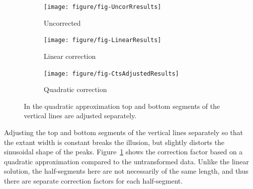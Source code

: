 \documentclass[12pt]{article}\usepackage[]{graphicx}\usepackage[]{color}
\newenvironment{knitrout}{}{} %
\begin{document}
\begin{figure}[h!btp]
\begin{subfigure}[b]{.32\textwidth}\centering
\begin{knitrout}
\color{fgcolor}

{\centering \texttt{[image: figure/fig-UncorRresults]} 

}



\end{knitrout}
\caption{Uncorrected}
\end{subfigure}
\begin{subfigure}[b]{.32\textwidth}\centering
\begin{knitrout}
\color{fgcolor}

{\centering \texttt{[image: figure/fig-LinearResults]} 

}



\end{knitrout}
\caption{Linear correction}
\end{subfigure}
%
\begin{subfigure}[b]{.32\textwidth}\centering
\begin{knitrout}
\color{fgcolor}

{\centering \texttt{[image: figure/fig-CtsAdjustedResults]} 

}



\end{knitrout}
\caption{Quadratic correction}
\end{subfigure}
\caption[Quadratic Approximation]{
In the quadratic approximation top and bottom segments of the vertical lines are adjusted separately.}
\label{fig:GeneralQuadraticCorrection} 
\end{figure}

Adjusting the top and bottom segments of the vertical lines separately so that the extant width is constant breaks the illusion, but slightly distorts the sinusoidal shape of the peaks.
%
Figure~\ref{fig:GeneralQuadraticCorrection} shows the correction factor based on a quadratic approximation compared to the untransformed data. 
Unlike the linear solution, the half-segments here are not necessarily of the same length, and thus there are separate correction factors for each half-segment. 
\end{document}
